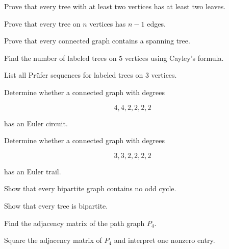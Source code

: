 \begin{exercise}[2]
Prove that every tree with at least two vertices has at least two
leaves.
\end{exercise}

\begin{exercise}[2]
Prove that every tree on \(n\) vertices has \(n-1\) edges.
\end{exercise}

\begin{exercise}[2]
Prove that every connected graph contains a spanning tree.
\end{exercise}

\begin{exercise}[2]
Find the number of labeled trees on \(5\) vertices using Cayley's
formula.
\end{exercise}

\begin{exercise}[2]
List all Prüfer sequences for labeled trees on \(3\) vertices.
\end{exercise}

\begin{exercise}[2]
Determine whether a connected graph with degrees

\[
4,4,2,2,2,2
\]

has an Euler circuit.
\end{exercise}

\begin{exercise}[2]
Determine whether a connected graph with degrees

\[
3,3,2,2,2,2
\]

has an Euler trail.
\end{exercise}

\begin{exercise}[2]
Show that every bipartite graph contains no odd cycle.
\end{exercise}

\begin{exercise}[2]
Show that every tree is bipartite.
\end{exercise}

\begin{exercise}[2]
Find the adjacency matrix of the path graph \(P_4\).
\end{exercise}

\begin{exercise}[2]
Square the adjacency matrix of \(P_4\) and interpret one nonzero entry.
\end{exercise}

